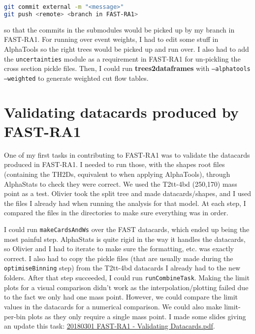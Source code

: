 \begin{lstlisting}[belowskip=-0.7cm, language=sh, numbers=none]
git commit external -m "<message>"
git push <remote> <branch in FAST-RA1>
\end{lstlisting}

so that the commits in the submodules would be picked up by my branch in FAST-RA1. For running over event weights, I had to edit some stuff in AlphaTools so the right trees would be picked up and run over. I also had to add the \texttt{uncertainties} module as a requirement in FAST-RA1 for un-pickling the cross section pickle files. Then, I could run \textbf{trees2dataframes} with \texttt{--alphatools --weighted} to generate weighted cut flow tables.


\section{Validating datacards produced by FAST-RA1}

One of my first tasks in contributing to FAST-RA1 was to validate the datacards produced in FAST-RA1. I needed to run those, with the shapes root files (containing the TH2Ds, equivalent to when applying AlphaTools), through AlphaStats to check they were correct. We used the T2tt-4bd (250,170) mass point as a test. Olivier took the split tree and made datacards/shapes, and I used the files I already had when running the analysis for that model. At each step, I compared the files in the directories to make sure everything was in order.

I could run \texttt{makeCardsAndWs} over the FAST datacards, which ended up being the most painful step. AlphaStats is quite rigid in the way it handles the datacards, so Olivier and I had to iterate to make sure the formatting, etc. was exactly correct. I also had to copy the pickle files (that are usually made during the \texttt{optimiseBinning} step) from the T2tt-4bd datacards I already had to the new folders. After that step succeeded, I could run \texttt{runCombineTask}. Making the limit plots for a visual comparison didn't work as the interpolation/plotting failed due to the fact we only had one mass point. However, we could compare the limit values in the datacards for a numerical comparison. We could also make limit-per-bin plots as they only require a single mass point. I made some slides giving an update this task: \href{run:modules/Sec 36 - FAST-RA1/figures/20180301 FAST-RA1 - Validating Datacards.pdf}{20180301 FAST-RA1 - Validating Datacards.pdf}.

